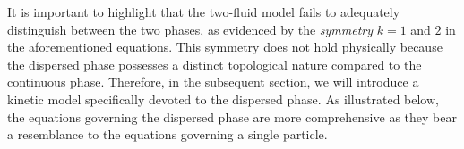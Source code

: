 It is important to highlight that the two-fluid model fails to adequately distinguish between the two phases, as evidenced by the \textit{symmetry} $k = 1$ and $2$ in the aforementioned equations. This symmetry does not hold physically because the dispersed phase possesses a distinct topological nature compared to the continuous phase. Therefore, in the subsequent section, we will introduce a kinetic model specifically devoted to the dispersed phase. As illustrated below, the equations governing the dispersed phase are more comprehensive as they bear a resemblance to the equations governing a single particle.




